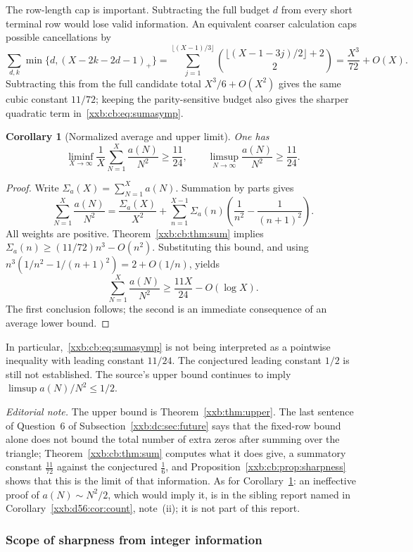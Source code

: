 \documentclass[11pt,a4paper]{article}
\numberwithin{equation}{section}
\newtheorem{corollary}[theorem]{Corollary}
\theoremstyle{definition}
\theoremstyle{remark}
\theoremstyle{plain}
\begin{document}
The row-length cap is important. Subtracting the full budget $d$ from every
short terminal row would lose valid information. An equivalent coarser
calculation caps possible cancellations by
\[
 \sum_{d,k}\min\{d,(X-2k-2d-1)_+\}
 =\sum_{j=1}^{\lfloor(X-1)/3\rfloor}
 \binom{\lfloor(X-1-3j)/2\rfloor+2}{2}
 =\frac{X^3}{72}+O(X).
\]
Subtracting this from the full candidate total $X^3/6+O(X^2)$ gives the same
cubic constant $11/72$; keeping the parity-sensitive budget also gives the
sharper quadratic term in~\eqref{xxb:cb:eq:sumasymp}.

\begin{corollary}[Normalized average and upper limit]\label{xxb:cb:cor:average}
One has
\[
 \liminf_{X\to\infty}\frac1X\sum_{N=1}^X\frac{a(N)}{N^2}
 \ge\frac{11}{24},\qquad
 \limsup_{N\to\infty}\frac{a(N)}{N^2}\ge\frac{11}{24}.
\]
\end{corollary}
\begin{proof}
Write $\Sigma_a(X)=\sum_{N=1}^Xa(N)$. Summation by parts gives
\[
 \sum_{N=1}^X\frac{a(N)}{N^2}
 =\frac{\Sigma_a(X)}{X^2}
 +\sum_{n=1}^{X-1}\Sigma_a(n)\left(\frac1{n^2}-\frac1{(n+1)^2}\right).
\]
All weights are positive. Theorem~\ref{xxb:cb:thm:sum} implies
$\Sigma_a(n)\ge(11/72)n^3-O(n^2)$. Substituting this bound, and using
$n^3(1/n^2-1/(n+1)^2)=2+O(1/n)$, yields
\[
 \sum_{N=1}^X\frac{a(N)}{N^2}\ge\frac{11X}{24}-O(\log X).
\]
The first conclusion follows; the second is an immediate consequence of an
average lower bound.
\end{proof}
In particular,~\eqref{xxb:cb:eq:sumasymp} is not being interpreted as a
pointwise inequality with leading constant $11/24$. The conjectured leading
constant $1/2$ is still not established. The source's upper bound continues to
imply $\limsup a(N)/N^2\le1/2$.

\emph{Editorial note.}  The upper bound is Theorem~\ref{xxb:thm:upper}.  The
last sentence of Question~6 of Subsection~\ref{xxb:dc:sec:future} says that
the fixed-row bound alone does not bound the total number of extra zeros after
summing over the triangle; Theorem~\ref{xxb:cb:thm:sum} computes what it does
give, a summatory constant $\tfrac{11}{72}$ against the conjectured
$\tfrac16$, and Proposition~\ref{xxb:cb:prop:sharpness} shows that this is the
limit of that information.  As for Corollary~\ref{xxb:cb:cor:average}: an
ineffective proof of $a(N)\sim N^2/2$, which would imply it, is in the sibling
report named in Corollary~\ref{xxb:d56:cor:count}, note~(ii); it is not part
of this report.

\subsubsection{Scope of sharpness from integer information}
\end{document}
